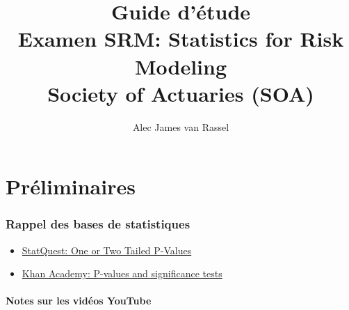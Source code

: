 \documentclass[12pt, titlepage, french]{report}
\title{
	Guide d'étude	\\
	\large Examen SRM: Statistics for Risk Modeling 	\\
	Society of Actuaries (SOA)}
\date{}
\author{Alec James van Rassel}
\begin{document}
\maketitle

\tableofcontents

\clearpage

\part*{Préliminaires}

\section{Rappel des bases de statistiques}

\begin{YTB_vids}
\begin{itemize}
	\item	\href{https://www.youtube.com/watch?v=bsZGt-caXO4}{StatQuest: One or Two Tailed P-Values}
	\item	\href{https://www.youtube.com/watch?v=KS6KEWaoOOE}{Khan Academy: P-values and significance tests}
\end{itemize}
\end{YTB_vids}

\subsection{Notes sur les vidéos YouTube}
\end{document}
